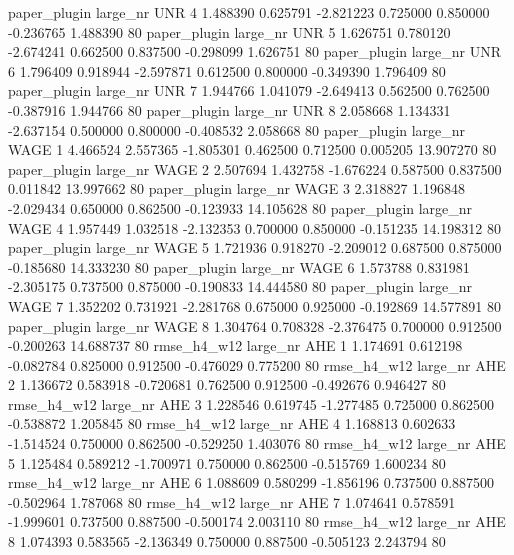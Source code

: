 paper_plugin   large_nr      UNR                 4  1.488390  0.625791  -2.821223 0.725000 0.850000 -0.236765    1.488390 80
paper_plugin   large_nr      UNR                 5  1.626751  0.780120  -2.674241 0.662500 0.837500 -0.298099    1.626751 80
paper_plugin   large_nr      UNR                 6  1.796409  0.918944  -2.597871 0.612500 0.800000 -0.349390    1.796409 80
paper_plugin   large_nr      UNR                 7  1.944766  1.041079  -2.649413 0.562500 0.762500 -0.387916    1.944766 80
paper_plugin   large_nr      UNR                 8  2.058668  1.134331  -2.637154 0.500000 0.800000 -0.408532    2.058668 80
paper_plugin   large_nr     WAGE                 1  4.466524  2.557365  -1.805301 0.462500 0.712500  0.005205   13.907270 80
paper_plugin   large_nr     WAGE                 2  2.507694  1.432758  -1.676224 0.587500 0.837500  0.011842   13.997662 80
paper_plugin   large_nr     WAGE                 3  2.318827  1.196848  -2.029434 0.650000 0.862500 -0.123933   14.105628 80
paper_plugin   large_nr     WAGE                 4  1.957449  1.032518  -2.132353 0.700000 0.850000 -0.151235   14.198312 80
paper_plugin   large_nr     WAGE                 5  1.721936  0.918270  -2.209012 0.687500 0.875000 -0.185680   14.333230 80
paper_plugin   large_nr     WAGE                 6  1.573788  0.831981  -2.305175 0.737500 0.875000 -0.190833   14.444580 80
paper_plugin   large_nr     WAGE                 7  1.352202  0.731921  -2.281768 0.675000 0.925000 -0.192869   14.577891 80
paper_plugin   large_nr     WAGE                 8  1.304764  0.708328  -2.376475 0.700000 0.912500 -0.200263   14.688737 80
 rmse_h4_w12   large_nr      AHE                 1  1.174691  0.612198  -0.082784 0.825000 0.912500 -0.476029    0.775200 80
 rmse_h4_w12   large_nr      AHE                 2  1.136672  0.583918  -0.720681 0.762500 0.912500 -0.492676    0.946427 80
 rmse_h4_w12   large_nr      AHE                 3  1.228546  0.619745  -1.277485 0.725000 0.862500 -0.538872    1.205845 80
 rmse_h4_w12   large_nr      AHE                 4  1.168813  0.602633  -1.514524 0.750000 0.862500 -0.529250    1.403076 80
 rmse_h4_w12   large_nr      AHE                 5  1.125484  0.589212  -1.700971 0.750000 0.862500 -0.515769    1.600234 80
 rmse_h4_w12   large_nr      AHE                 6  1.088609  0.580299  -1.856196 0.737500 0.887500 -0.502964    1.787068 80
 rmse_h4_w12   large_nr      AHE                 7  1.074641  0.578591  -1.999601 0.737500 0.887500 -0.500174    2.003110 80
 rmse_h4_w12   large_nr      AHE                 8  1.074393  0.583565  -2.136349 0.750000 0.887500 -0.505123    2.243794 80
